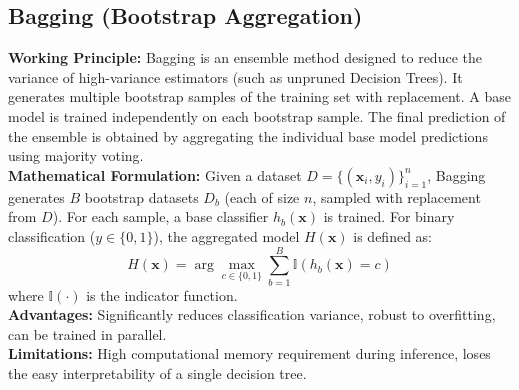 \documentclass[12pt,a4paper]{article}
\begin{document}
\subsection{Bagging (Bootstrap Aggregation)}
\textbf{Working Principle:} Bagging is an ensemble method designed to reduce the variance of high-variance estimators (such as unpruned Decision Trees). It generates multiple bootstrap samples of the training set with replacement. A base model is trained independently on each bootstrap sample. The final prediction of the ensemble is obtained by aggregating the individual base model predictions using majority voting.\\
\textbf{Mathematical Formulation:}
Given a dataset $D = \{(\mathbf{x}_i, y_i)\}_{i=1}^n$, Bagging generates $B$ bootstrap datasets $D_b$ (each of size $n$, sampled with replacement from $D$). For each sample, a base classifier $h_b(\mathbf{x})$ is trained. For binary classification ($y \in \{0, 1\}$), the aggregated model $H(\mathbf{x})$ is defined as:
\begin{equation}
H(\mathbf{x}) = \arg\max_{c \in \{0, 1\}} \sum_{b=1}^B \mathbb{I}(h_b(\mathbf{x}) = c)
\end{equation}
where $\mathbb{I}(\cdot)$ is the indicator function.\\
\textbf{Advantages:} Significantly reduces classification variance, robust to overfitting, can be trained in parallel.\\
\textbf{Limitations:} High computational memory requirement during inference, loses the easy interpretability of a single decision tree.
\end{document}
